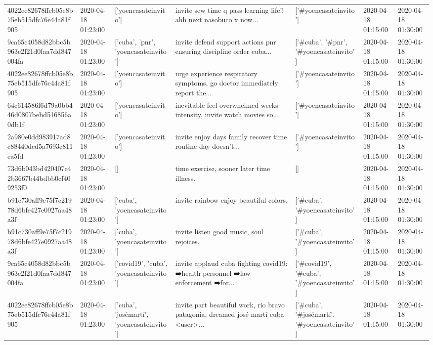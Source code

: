\begin{tabular}{lllllll}
4022ee82678ffcb05e8b75eb515dfc76e44a81f905 & 2020-04-18 01:23:00 & ['yoencasateinvito'] & invite sew time q pass learning life!! ahh next nasobuco x now... & ['#yoencasateinvito'] & 2020-04-18 01:15:00 & 2020-04-18 01:30:00 \\
9ca65c4058d82bbc5b963e2f21d0faa7dd847004fa & 2020-04-18 01:23:00 & ['cuba', 'pnr', 'yoencasateinvito'] & invite defend support actions pnr ensuring discipline order cuba... & ['#cuba', '#pnr', '#yoencasateinvito'] & 2020-04-18 01:15:00 & 2020-04-18 01:30:00 \\
4022ee82678ffcb05e8b75eb515dfc76e44a81f905 & 2020-04-18 01:23:00 & ['yoencasateinvito'] & urge experience respiratory symptoms, go doctor immediately report the... & ['#yoencasateinvito'] & 2020-04-18 01:15:00 & 2020-04-18 01:30:00 \\
64c614586f6d79a0bb446d0807bebd516856a0db1f & 2020-04-18 01:23:00 & ['yoencasateinvito'] & inevitable feel overwhelmed weeks intensity, invite watch movies so... & ['#yoencasateinvito'] & 2020-04-18 01:15:00 & 2020-04-18 01:30:00 \\
2a980e0dd983917ad8c88440dcd5a7693c811ca5fd & 2020-04-18 01:23:00 & ['yoencasateinvito'] & invite enjoy days family recover time routine day doesn't... & ['#yoencasateinvito'] & 2020-04-18 01:15:00 & 2020-04-18 01:30:00 \\
73d6b043bd420407e42b3667b44bdbb0cf409253f0 & 2020-04-18 01:23:00 & [] & time exercise, sooner later time illness. & [] & 2020-04-18 01:15:00 & 2020-04-18 01:30:00 \\
b91c730aff9e75f7c21978d6bfe427e0927aa48a3f & 2020-04-18 01:23:00 & ['cuba', 'yoencasateinvito'] & invite rainbow enjoy beautiful colors. & ['#cuba', '#yoencasateinvito'] & 2020-04-18 01:15:00 & 2020-04-18 01:30:00 \\
b91c730aff9e75f7c21978d6bfe427e0927aa48a3f & 2020-04-18 01:23:00 & ['cuba', 'yoencasateinvito'] & invite listen good music, soul rejoices. & ['#cuba', '#yoencasateinvito'] & 2020-04-18 01:15:00 & 2020-04-18 01:30:00 \\
9ca65c4058d82bbc5b963e2f21d0faa7dd847004fa & 2020-04-18 01:23:00 & ['covid19', 'cuba', 'yoencasateinvito'] & invite applaud cuba fighting covid19: ➡️health personnel ➡️law enforcement ➡️for... & ['#covid19', '#cuba', '#yoencasateinvito'] & 2020-04-18 01:15:00 & 2020-04-18 01:30:00 \\
4022ee82678ffcb05e8b75eb515dfc76e44a81f905 & 2020-04-18 01:23:00 & ['cuba', 'josémartí', 'yoencasateinvito'] & invite part beautiful work, rio bravo patagonia, dreamed josé martí cuba <user>... & ['#cuba', '#josémartí', '#yoencasateinvito'] & 2020-04-18 01:15:00 & 2020-04-18 01:30:00 \\

\end{tabular}
